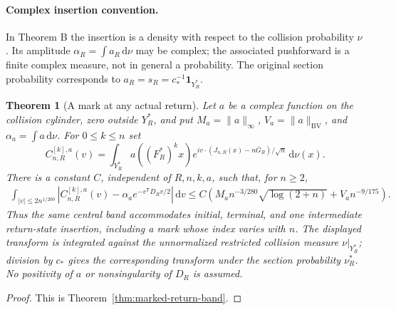 \documentclass[11pt,reqno]{amsart}
\numberwithin{equation}{section}
\newtheorem{maintheorem}{Theorem}
\theoremstyle{definition}\newtheorem{definition}[theorem]{Definition}
\theoremstyle{remark}\newtheorem{remark}[theorem]{Remark}
\newcommand{\dd}{\,\mathrm d}\newcommand{\one}{\mathbf1}
\begin{document}
\paragraph{Complex insertion convention.}
In Theorem B the insertion is a density with respect to the collision
probability $\nu$. Its amplitude $\alpha_R=\int a_R\dd\nu$ may be
complex; the associated pushforward is a finite complex measure, not
in general a probability. The original section probability corresponds
to $a_R=s_R=c_*^{-1}\one_{Y_R^*}$.

\begin{maintheorem}[A mark at any actual return]
\label{thm:intro-marked-return}
Let $a$ be a complex function on the collision cylinder, zero outside
$Y_R^*$, and put $M_a=\|a\|_\infty$, $V_a=\|a\|_{\mathrm{BV}}$,
and $\alpha_a=\int a\dd\nu$. For $0\le k\le n$ set
\[
 C^{[k],a}_{n,R}(v)=\int_{Y_R^*}a((F_R^*)^k x)
       e^{iv\cdot(J_{n,R}(x)-n\bar G_R)/\sqrt n}\dd\nu(x).
\]
There is a constant $C$, independent of $R,n,k,a$, such that, for $n\ge2$,
\begin{align*}
 \int_{|v|\le2n^{1/200}}
 \left|C^{[k],a}_{n,R}(v)-\alpha_a e^{-v^{\mathsf T}D_Rv/2}\right|\dd v
 \le C\left(M_an^{-3/280}\sqrt{\log(2+n)}+V_an^{-9/175}\right).
\end{align*}
Thus the same central band accommodates initial, terminal, and one
intermediate return-state insertion, including a mark whose index
varies with $n$. The displayed transform is integrated against the
unnormalized restricted collision measure $\nu|_{Y_R^*}$; division by
$c_*$ gives the corresponding transform under the section probability
$\nu_R^*$. No positivity of $a$ or nonsingularity of $D_R$ is assumed.
\end{maintheorem}
\begin{proof}
This is Theorem~\ref{thm:marked-return-band}.
\end{proof}
\end{document}
